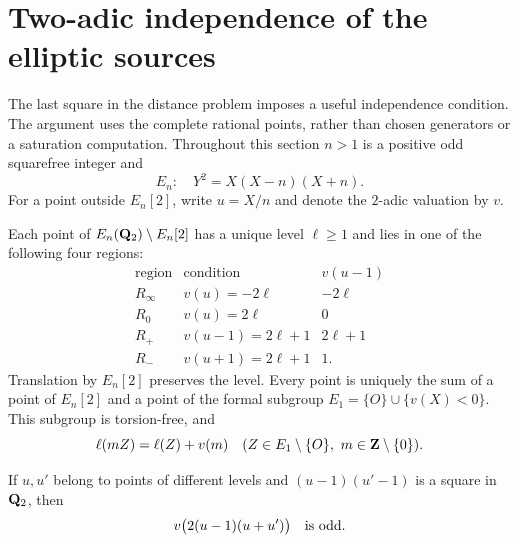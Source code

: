 \section{Two-adic independence of the elliptic sources}
\label{sec:source-independence}

The last square in the distance problem imposes a useful independence
condition.  The argument uses the complete rational points, rather than
chosen generators or a saturation computation.
Throughout this section $n>1$ is a positive odd squarefree integer and
\[
 E_n:\quad Y^2=X(X-n)(X+n).
\]
For a point outside $E_n[2]$, write $u=X/n$ and denote the
$2$-adic valuation by $v$.

\begin{lemma}
\label{lem:indp-level}
Each point of $E_n(\mathbf Q_2)\setminus E_n[2]$ has a unique level
$\ell\geq1$ and lies in one of the following four regions:
\[
\begin{array}{c|c|c}
\text{region}&\text{condition}&v(u-1)\\\hline
R_\infty&v(u)=-2\ell&-2\ell\\
R_0&v(u)=2\ell&0\\
R_+&v(u-1)=2\ell+1&2\ell+1\\
R_-&v(u+1)=2\ell+1&1.
\end{array}
\]
Translation by $E_n[2]$ preserves the level.  Every point is uniquely
the sum of a point of $E_n[2]$ and a point of the formal subgroup
$E_1=\{O\}\cup\{v(X)<0\}$.  This subgroup is torsion-free, and
\[
 \ell(mZ)=\ell(Z)+v(m)
 \quad(Z\in E_1\setminus\{O\},\ m\in\mathbf Z\setminus\{0\}).
\]

If $u,u'$ belong to points of different levels and
$(u-1)(u'-1)$ is a square in $\mathbf Q_2$, then
\[
 v\bigl(2(u-1)(u+u')\bigr)\quad\hbox{is odd}.
\]
\end{lemma}


